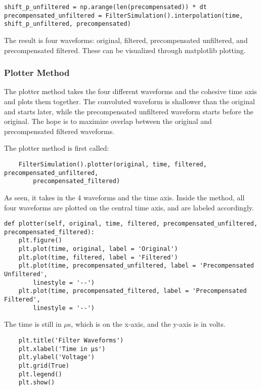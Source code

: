 \begin{verbatim}
shift_p_unfiltered = np.arange(len(precompensated)) * dt
precompensated_unfiltered = FilterSimulation().interpolation(time, 
shift_p_unfiltered, precompensated)

\end{verbatim}

The result is four waveforms: original, filtered, precompensated unfiltered, and precompensated filtered. These can be visualized through matplotlib plotting.

\subsubsection{Plotter Method}

The plotter method takes the four different waveforms and the cohesive time axis and plots them together. The convoluted waveform is shallower than the original and starts later, while the precompensated unfiltered waveform starts before the original. The hope is to maximize overlap between the original and precompensated filtered waveforms. 

The plotter method is first called:

\begin{verbatim}
    FilterSimulation().plotter(original, time, filtered, precompensated_unfiltered, 
        precompensated_filtered)
\end{verbatim}

As seen, it takes in the 4 waveforms and the time axis. Inside the method, all four waveforms are plotted on the central time axis, and are labeled accordingly.

\begin{verbatim}
def plotter(self, original, time, filtered, precompensated_unfiltered, 
precompensated_filtered):
    plt.figure()
    plt.plot(time, original, label = 'Original')
    plt.plot(time, filtered, label = 'Filtered')
    plt.plot(time, precompensated_unfiltered, label = 'Precompensated Unfiltered', 
        linestyle = '--')
    plt.plot(time, precompensated_filtered, label = 'Precompensated Filtered', 
        linestyle = '--')
\end{verbatim}

The time is still in $\mu$s, which is on the x-axis, and the y-axis is in volts.

\begin{verbatim}
    plt.title('Filter Waveforms')
    plt.xlabel('Time in µs')
    plt.ylabel('Voltage')
    plt.grid(True)
    plt.legend()
    plt.show()
\end{verbatim}

